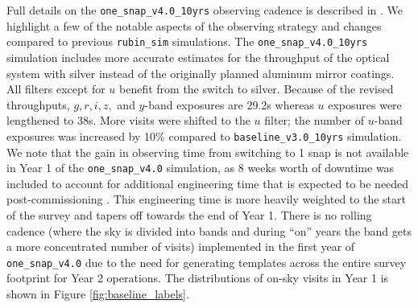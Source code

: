 \documentclass[preprintm,linenumbers]{aastex631}
\newcommand{\baseline}{\texttt{one\_snap\_v4.0}\xspace}
\newcommand{\baselinefull}{\texttt{one\_snap\_v4.0\_10yrs}\xspace}
\newcommand{\rubinsim}{\texttt{rubin\_sim}\xspace}
\begin{document}
    Full details on the \baselinefull observing cadence is described in \cite{SCOC_Report_3}. 
    We highlight a few of the notable aspects of the observing strategy and changes compared to previous \rubinsim simulations. 
    The \baselinefull simulation includes more accurate estimates for the throughput of the optical system with silver instead of the originally planned aluminum mirror coatings. 
    All filters except for $u$ benefit from the switch to silver. Because of the revised throughputs, $g,r,i,z,$ and $y$-band exposures are 29.2s whereas $u$ exposures were lengthened to 38s.
    More visits were shifted to the $u$ filter; the number of $u$-band exposures was increased by 10$\%$ compared to \texttt{baseline\_v3.0\_10yrs} simulation. 
    We note that the gain in observing time from switching to 1 snap is not available in Year 1 of the \baseline simulation, as 8 weeks worth of downtime was included to account for additional engineering time that is expected to be needed post-commissioning \citep{SCOC_Report_3}. 
    This engineering time is more heavily weighted to the start of the survey and tapers off towards the end of Year 1. 
    There is no rolling cadence (where the sky is divided into bands and during ``on'' years the band gets a more concentrated number of visits) implemented in the first year of \baseline due to the need for generating templates across the entire survey footprint for Year 2 operations. 
    The distributions of on-sky visits in Year 1 is shown in Figure \ref{fig:baseline_labels}.   
	
\end{document}
